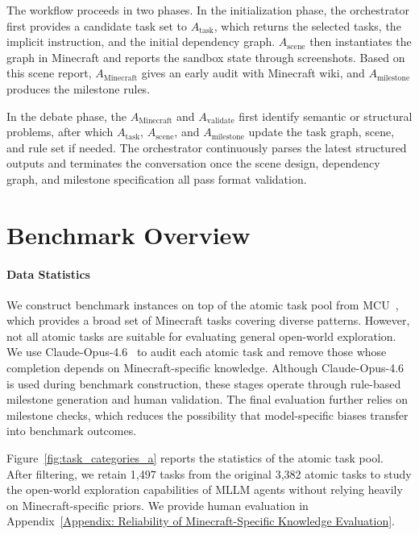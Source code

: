 \documentclass[11pt]{article}
\begin{document}
The workflow proceeds in two phases. 
In the initialization phase, the orchestrator first provides a candidate task set to $A_\mathrm{task}$, which returns the selected tasks, the implicit instruction, and the initial dependency graph. 
$A_\mathrm{scene}$ then instantiates the graph in Minecraft and reports the sandbox state through screenshots. 
Based on this scene report, $A_\mathrm{Minecraft}$ gives an early audit with Minecraft wiki, and $A_\mathrm{milestone}$  produces the milestone rules. 

In the debate phase, the $A_\mathrm{Minecraft}$ and $A_\mathrm{validate}$ first identify semantic or structural problems, after which $A_\mathrm{task}$, $A_\mathrm{scene}$, and $A_\mathrm{milestone}$  update the task graph, scene, and rule set if needed. 
The orchestrator continuously parses the latest structured outputs and terminates the conversation once the scene design, dependency graph, and milestone specification all pass format validation. 

\section{Benchmark Overview}

\paragraph{Data Statistics}
We construct benchmark instances on top of the atomic task pool from MCU~\citep{MCU}, which provides a broad set of Minecraft tasks covering diverse patterns. 
However, not all atomic tasks are suitable for evaluating general open-world exploration. 
We use Claude-Opus-4.6~\citep{Claude-Opus-4.6} to audit each atomic task and remove those whose completion depends on Minecraft-specific knowledge. 
Although Claude-Opus-4.6 is used during benchmark construction, these stages operate through rule-based milestone generation and human validation. The final evaluation further relies on milestone checks, which reduces the possibility that model-specific biases transfer into benchmark outcomes. 

Figure~\ref{fig:task_categories_a} reports the statistics of the atomic task pool. 
After filtering, we retain 1,497 tasks from the original 3,382 atomic tasks to study the open-world exploration capabilities of MLLM agents without relying heavily on Minecraft-specific priors. 
We provide human evaluation in Appendix~\ref{Appendix: Reliability of Minecraft-Specific Knowledge Evaluation}.
\end{document}
